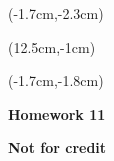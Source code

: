 \documentclass[12pt, oneside]{article}
\begin{document}
\begin{textblock*}{4cm}(-1.7cm,-2.3cm)
\end{textblock*}

\begin{textblock*}{8cm}(12.5cm,-1cm)
\end{textblock*}
\begin{textblock*}{13.5cm}(-1.7cm,-1.8cm)
\end{textblock*}

\vspace{1cm}

\begin{center}
\textbf{\Large Homework 11}

\textbf{Not for credit}
\end{center}
\end{document}
